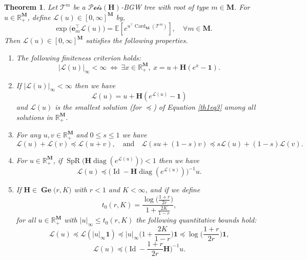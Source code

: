 \documentclass[reqno,final,11pt]{amsart}
\theoremstyle{plain}
\newtheorem{theorem}{Theorem}[section]
\theoremstyle{definition}
\theoremstyle{remark}
\newcommand{\R}{\mathds{R}}
\newcommand{\E}[1]{\mathds{E}\left[#1\right]}
\newcommand{\M}{\bm{M}}
\newcommand{\Ge}[2]{\bm{\Gel(} #1,#2 \bm{)} }
\newcommand{\T}{\mathcal{T}}
\renewcommand{\L}{\bm{\mathscr{L}}}
\newcommand{\ones}{\bm{1}}
\newcommand{\e}{\bm{e}}
\renewcommand{\H}{\bm{H}}
\newcommand{\pos}{\R_+^{\M}}
\newcommand{\Pois}{\mathscr{P}\!\mathscr{o}\!\mathscr{i}\!\mathscr{s}}
\newcommand{\trp}{^{\intercal}}
\DeclareMathOperator{\card}{Card}
\DeclareMathOperator{\diag}{diag}
\DeclareMathOperator{\spr}{SpR}
\DeclareMathOperator{\Gel}{Ge}
\DeclareMathOperator{\Id}{Id}
\begin{document}
\begin{theorem}\label{theorem1}
    Let $\T^{m}$ be a $\Pois(\H)$-BGW tree with root of type $m\in\M$. For $u\in\pos$, define $\L(u)\in [0,\infty]^{\M}$ by,
    \begin{equation}\label{th1eq1}
    	\exp\big( \e_{m}\trp \L(u)\big) = \E{e^{u\trp \card_{\M}(\T^{m})}}, \quad \forall m\in\M.
    \end{equation}
    Then $\L(u) \in [0,\infty]^{\M}$ satisfies the following properties.
    \begin{enumerate}
        \item The following finiteness criterion holds:
        \begin{equation}\label{th1eq2}
        \vert \L(u) \vert_{\infty} < \infty \ \Longleftrightarrow \ \exists  x\in\pos, \ x = u+\H(e^x-\ones).
        \end{equation}
        \item If $\vert \L(u) \vert_{\infty} < \infty$ then we have
        \begin{equation}\label{th1eq3}
            \L(u) = u+\H(e^{\L(u)}-\ones)
        \end{equation}
        and $\L(u)$ is the smallest solution (for $\preceq$) of Equation \eqref{th1eq3} among all solutions in $\pos$.       	
        \item For any $u,v \in \pos$ and $0\leq s\leq 1$ we have
    	\begin{equation}\label{th1eq4}
    		\L(u)+\L(v) \preceq \L(u+v), \quad \text{and} \quad \L(su+(1-s)v) \preceq s\L(u) + (1-s)\L(v).
    	\end{equation}
    	\item For $u\in\pos$, if $\spr\big(\H \diag(e^{\L(u)})\big) <1$ then we have 
    	\begin{equation}\label{th1eq5}
    		\L(u) \preceq \Big(\Id - \H \diag(e^{\L(u)})\Big)^{-1} u.
    	\end{equation}
        \item If $\H\in\Ge{r}{K}$ with $r<1$ and $K<\infty$, and if we define
        \begin{equation}\label{th1eq6}
            t_0(r,K) = \frac{\log\big( \frac{1+r}{2r}\big)}{1+\frac{2K}{1-r}},
        \end{equation}
        for all $u\in\pos$ with $\vert u\vert_{\infty} \leq t_0(r,K)$ the following quantitative bounds hold:
        \begin{equation}\label{th1eq7}
            \L(u) \preceq \L(\vert u\vert_{\infty}\ones) \preceq \vert u\vert_{\infty} \big( 1+ \frac{2K}{1-r}\big) \ones \preceq  \log\big( \frac{1+r}{2r}\big) \ones ,
        \end{equation}
        \begin{equation}\label{th1eq8}
            \L(u) \preceq  \Big( \Id - \frac{1+r}{2r} \H\Big)^{-1} u.
        \end{equation}
    \end{enumerate}
\end{theorem}
\end{document}
